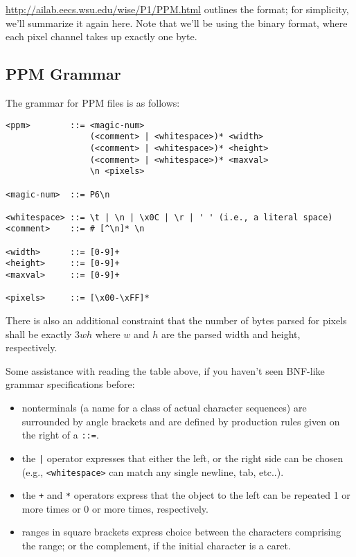 \documentclass{article}
\begin{document}
\url{http://ailab.eecs.wsu.edu/wise/P1/PPM.html} outlines the format; for simplicity, we'll summarize it again here. Note that we'll be using the binary format, where each pixel channel takes up exactly one byte.

\subsection*{PPM Grammar}

The grammar for PPM files is as follows:

\begin{verbatim}
<ppm>        ::= <magic-num>
                 (<comment> | <whitespace>)* <width>
                 (<comment> | <whitespace>)* <height>
                 (<comment> | <whitespace>)* <maxval>
                 \n <pixels>

<magic-num>  ::= P6\n

<whitespace> ::= \t | \n | \x0C | \r | ' ' (i.e., a literal space)
<comment>    ::= # [^\n]* \n

<width>      ::= [0-9]+
<height>     ::= [0-9]+
<maxval>     ::= [0-9]+

<pixels>     ::= [\x00-\xFF]*
\end{verbatim}

There is also an additional constraint that the number of bytes parsed for pixels shall be exactly \(3wh\) where \(w\) and \(h\) are the parsed width and height, respectively.

Some assistance with reading the table above, if you haven't seen BNF-like grammar specifications before:
\begin{itemize}
    \item nonterminals (a name for a class of actual character sequences) are surrounded by angle brackets and are defined by production rules given on the right of a \texttt{::=}.
    \item the \texttt{|} operator expresses that either the left, or the right side can be chosen (e.g., \texttt{<whitespace>} can match any single newline, tab, etc..).
    \item the \texttt{+} and \texttt{*} operators express that the object to the left can be repeated 1 or more times or 0 or more times, respectively.
    \item ranges in square brackets express choice between the characters comprising the range; or the complement, if the initial character is a caret.
\end{itemize}
\end{document}
